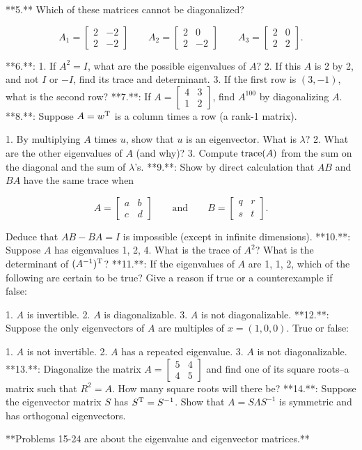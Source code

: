

**5.** Which of these matrices cannot be diagonalized?

\[A_{1}=\begin{bmatrix}2&-2\\ 2&-2\end{bmatrix}\qquad A_{2}=\begin{bmatrix}2&0\\ 2&-2\end{bmatrix}\qquad A_{3}=\begin{bmatrix}2&0\\ 2&2\end{bmatrix}.\]

**6.**:
1. If \(A^{2}=I\), what are the possible eigenvalues of \(A\)? 2. If this \(A\) is 2 by 2, and not \(I\) or \(-I\), find its trace and determinant. 3. If the first row is \((3,-1)\), what is the second row?
**7.**: If \(A=\begin{bmatrix}4&3\\ 1&2\end{bmatrix}\), find \(A^{100}\) by diagonalizing \(A\).
**8.**: Suppose \(A=w^{\rm T}\) is a column times a row (a rank-1 matrix).

1. By multiplying \(A\) times \(u\), show that \(u\) is an eigenvector. What is \(\lambda\)? 2. What are the other eigenvalues of \(A\) (and why)? 3. Compute \({\rm trace}(A)\) from the sum on the diagonal and the sum of \(\lambda\)'s.
**9.**: Show by direct calculation that \(AB\) and \(BA\) have the same trace when

\[A=\begin{bmatrix}a&b\\ c&d\end{bmatrix}\qquad\text{and}\qquad B=\begin{bmatrix}q&r\\ s&t\end{bmatrix}.\]

 Deduce that \(AB-BA=I\) is impossible (except in infinite dimensions).
**10.**: Suppose \(A\) has eigenvalues 1, 2, 4. What is the trace of \(A^{2}\)? What is the determinant of \((A^{-1})^{\rm T}\)?
**11.**: If the eigenvalues of \(A\) are 1, 1, 2, which of the following are certain to be true? Give a reason if true or a counterexample if false:

1. \(A\) is invertible.
2. \(A\) is diagonalizable.
3. \(A\) is not diagonalizable.
**12.**: Suppose the only eigenvectors of \(A\) are multiples of \(x=(1,0,0)\). True or false:

1. \(A\) is not invertible.
2. \(A\) has a repeated eigenvalue.
3. \(A\) is not diagonalizable.
**13.**: Diagonalize the matrix \(A=\begin{bmatrix}5&4\\ 4&5\end{bmatrix}\) and find one of its square roots--a matrix such that \(R^{2}=A\). How many square roots will there be?
**14.**: Suppose the eigenvector matrix \(S\) has \(S^{\rm T}=S^{-1}\). Show that \(A=S\Lambda S^{-1}\) is symmetric and has orthogonal eigenvectors.

**Problems 15-24 are about the eigenvalue and eigenvector matrices.**